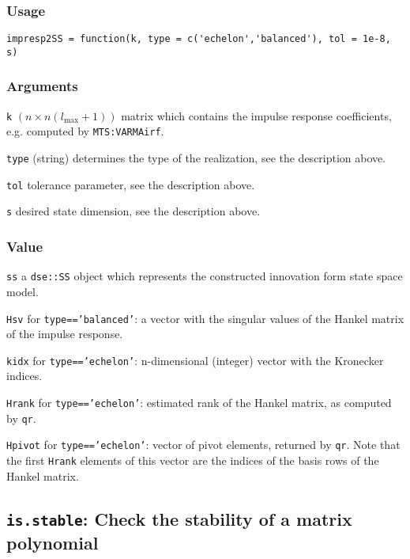 \documentclass[]{article}
\begin{document}
\subsubsection*{Usage}\begin{verbatim}
impresp2SS = function(k, type = c('echelon','balanced'), tol = 1e-8, s)
\end{verbatim}\subsubsection*{Arguments}\begin{description}
\item \texttt{k} $(n \times n(l_{\mbox{max}}+1))$ matrix which contains the impulse 
          response coefficients, e.g. computed by \texttt{MTS:VARMAirf}.
\item \texttt{type} (string) determines the type of the realization, 
         see the description above.
\item \texttt{tol} tolerance parameter, see the description above.
\item \texttt{s} desired state dimension, see the description above.
\end{description}\subsubsection*{Value}\begin{description}
\item \texttt{ss} a \texttt{dse::SS} object which represents the
         constructed innovation form state space model.
\item \texttt{Hsv} for \texttt{type=='balanced'}: a vector with the 
        singular values of the Hankel matrix of the impulse response.
\item \texttt{kidx} for \texttt{type=='echelon'}: n-dimensional (integer) 
        vector with the Kronecker indices.
\item \texttt{Hrank} for \texttt{type=='echelon'}: estimated rank of 
       the Hankel matrix, as computed by \texttt{qr}.
\item \texttt{Hpivot} for \texttt{type=='echelon'}: vector of pivot elements, 
       returned by \texttt{qr}. Note that the first \texttt{Hrank} elements of 
       this vector are the indices of the basis rows of the Hankel matrix.
\end{description}

\subsection{\texorpdfstring{\texttt{is.stable}: Check the stability of a
matrix
polynomial}{is.stable: Check the stability of a matrix polynomial}}\label{is.stable-check-the-stability-of-a-matrix-polynomial}
\end{document}
